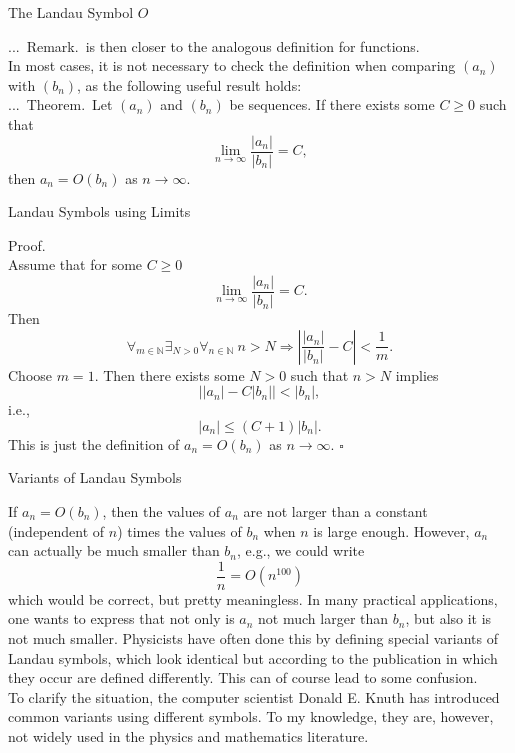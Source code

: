 \documentclass[smaller,hyperref={CJKbookmarks=true}]{beamer}
\newcommand{\N}{\mathbb{N}} \newcommand{\Z}{\mathbb{Z}} \newcommand{\Q}{\mathbb{Q}}
\newenvironment{PROOF}{{\noindent\!\sf\alert{Proof.}}\\}{\hfill$\square$\\}
\newcounter{zhuo}[subsection]
\renewcommand{\thezhuo}{\thesection.\thesubsection.\arabic{zhuo}}
\newenvironment{REMARK}{\stepcounter{zhuo}\alert{\thezhuo.~Remark.\,}}{}
\newenvironment{THEOREM}{\stepcounter{zhuo}\alert{\thezhuo.~Theorem.\,}}{}
\begin{document}
\begin{frame}{The Landau Symbol $O$}
\begin{spacing}{1.05}
\begin{REMARK}
is then closer to the analogous definition for functions.\\[5pt]
In most cases, it is not necessary to check the definition when comparing $(a_n)$ with $(b_n)$, as the following useful result holds:\\[5pt]
\begin{THEOREM}
Let $(a_n)$ and $(b_n)$ be sequences. If there exists some $C\geq0$ such that
\[\lim_{n\to\infty}\frac{|a_n|}{|b_n|}=C,\]
then $a_n=O(b_n)$ as $n\to\infty$.
\end{THEOREM}
\end{REMARK}
\end{spacing}
\end{frame}
\begin{frame}[t]{Landau Symbols using Limits}
\begin{spacing}{1}
\begin{PROOF}
Assume that for some $C\geq0$
\[\lim_{n\to\infty}\frac{|a_n|}{|b_n|}=C.\]
Then
\[\mathop{\forall}_{m\in\N}\mathop{\exists}_{N>0}\mathop{\forall}_{n\in\N}
\:n>N\Rightarrow\left|\frac{|a_n|}{|b_n|}-C\right|<\frac{1}{m}.\]
Choose $m=1$. Then there exists some $N>0$ such that $n>N$ implies
\[\big||a_n|-C|b_n|\big|<|b_n|,\]
i.e.,
\[|a_n|\leq(C+1)|b_n|.\]
This is just the definition of $a_n=O(b_n)$ as $n\to\infty$.
\end{PROOF}
\end{spacing}
\end{frame}
\begin{frame}[t]{Variants of Landau Symbols}
\begin{spacing}{1.05}
If $a_n=O(b_n)$, then the values of $a_n$ are not larger than a constant (independent of $n$) times the values of $b_n$ when $n$ is large enough. However, $a_n$ can actually be much smaller than $b_n$, e.g., we could write
\[\frac{1}{n}=O(n^{100})\]
which would be correct, but pretty meaningless. In many practical
applications, one wants to express that not only is $a_n$ not much larger than
$b_n$, but also it is not much smaller. Physicists have often done this by
defining special variants of Landau symbols, which look identical but
according to the publication in which they occur are defined differently.
This can of course lead to some confusion.\\[5pt]
To clarify the situation, the computer scientist Donald E. Knuth has
introduced common variants using different symbols. To my knowledge,
they are, however, not widely used in the physics and mathematics
literature.
\end{spacing}
\end{frame}
\end{document}
